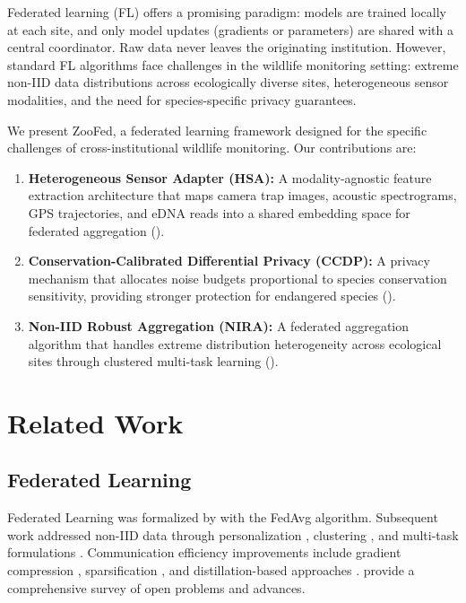 \documentclass[11pt,a4paper]{article}
\begin{document}
Federated learning (FL) \citep{mcmahan2017communication} offers a promising paradigm: models are trained locally at each site, and only model updates (gradients or parameters) are shared with a central coordinator.
Raw data never leaves the originating institution.
However, standard FL algorithms face challenges in the wildlife monitoring setting: extreme non-IID data distributions across ecologically diverse sites, heterogeneous sensor modalities, and the need for species-specific privacy guarantees.

We present ZooFed, a federated learning framework designed for the specific challenges of cross-institutional wildlife monitoring.
Our contributions are:

\begin{enumerate}[leftmargin=*]
    \item \textbf{Heterogeneous Sensor Adapter (HSA):} A modality-agnostic feature extraction architecture that maps camera trap images, acoustic spectrograms, GPS trajectories, and eDNA reads into a shared embedding space for federated aggregation ().
    \item \textbf{Conservation-Calibrated Differential Privacy (CCDP):} A privacy mechanism that allocates noise budgets proportional to species conservation sensitivity, providing stronger protection for endangered species ().
    \item \textbf{Non-IID Robust Aggregation (NIRA):} A federated aggregation algorithm that handles extreme distribution heterogeneity across ecological sites through clustered multi-task learning ().
\end{enumerate}

\section{Related Work}
\label{sec:related}

\subsection{Federated Learning}

Federated Learning was formalized by \citet{mcmahan2017communication} with the FedAvg algorithm.
Subsequent work addressed non-IID data through personalization \citep{li2020federated}, clustering \citep{ghosh2020efficient}, and multi-task formulations \citep{smith2017federated}.
Communication efficiency improvements include gradient compression \citep{alistarh2017qsgd}, sparsification \citep{stich2018sparsified}, and distillation-based approaches \citep{lin2020ensemble}.
\citet{kairouz2021advances} provide a comprehensive survey of open problems and advances.
\end{document}
